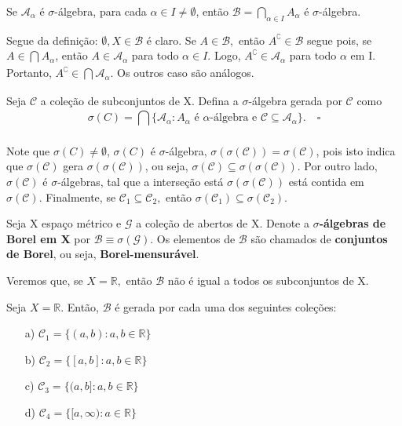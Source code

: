 \documentclass[measure_theory.tex]{subfiles}
\begin{document}
\begin{lemma*}
	Se \(\mathcal{A}_{\alpha }\) é \(\sigma \)-álgebra, para cada \(\alpha \in I \neq\emptyset\), então \(\mathcal{B} = \bigcap_{\alpha \in I}^{}A_{\alpha }\) é \(\sigma \)-álgebra.
\end{lemma*}
\begin{proof*}
	Segue da definição: \(\emptyset , X\in \mathcal{B}\) é claro. Se \(A\in \mathcal{B}, \) então \(A ^{\complement}\in \mathcal{B}\) segue pois, se \(A\in \bigcap_{}^{}A_{\alpha }\), então
	\(A\in \mathcal{A}_{\alpha }\) para todo \(\alpha \in I.\) Logo, \(A ^{\complement}\in \mathcal{A}_{\alpha }\) para todo \(\alpha \) em I. Portanto, \(A ^{\complement}\in \bigcap_{}^{}\mathcal{A}_{\alpha }\).
	Os outros caso são análogos. \qedsymbol
\end{proof*}
\begin{def*}
	Seja \(\mathcal{C}\) a coleção de subconjuntos de X. Defina a \(\sigma \)-álgebra gerada por \(\mathcal{C}\) como
	\[
		\sigma (C) = \bigcap_{}^{}\biggl\{\mathcal{A}_{\alpha }: A_{\alpha }\text{ é }\alpha \text{-álgebra e } \mathcal{C}\subseteq \mathcal{A}_{\alpha }\biggr\}.\quad \square
	\]
\end{def*}
Note que \(\sigma (C)\neq\emptyset\), \(\sigma (C) \) é \(\sigma \)-álgebra, \(\sigma (\sigma (\mathcal{C})) = \sigma (\mathcal{C})\), pois isto indica que \(\sigma (\mathcal{C})\) gera \(\sigma (\sigma (\mathcal{C}))\), ou seja, \(\sigma (\mathcal{C}) \subseteq \sigma (\sigma (\mathcal{C}))\). Por outro lado, \(\sigma (\mathcal{C})\) é \(\sigma \)-álgebras, tal que a interseção
está \(\sigma (\sigma (\mathcal{C}))\) está contida em \(\sigma (\mathcal{C}).\) Finalmente, se \(\mathcal{C}_{1}\subseteq \mathcal{C}_{2},\) então
\(\sigma (\mathcal{C}_{1}) \subseteq \sigma (\mathcal{C}_{2})\).
\begin{def*}
	Seja X espaço métrico e \(\mathcal{G}\) a coleção de abertos de X. Denote a \(\sigma \)\textbf{-álgebras de Borel em X} por \(\mathcal{B}\equiv \sigma (\mathcal{G}).\) Os elementos de \(\mathcal{B}\) são
	chamados de \textbf{conjuntos de Borel}, ou seja, \textbf{Borel-mensurável}.
\end{def*}
Veremos que, se \(X = \mathbb{R}, \) então \(\mathcal{B}\) não é igual a todos os subconjuntos de X.
\begin{prop*}
	Seja \(X = \mathbb{R}.\) Então, \(\mathcal{B}\) é gerada por cada uma dos seguintes coleções:
	\begin{itemize}
		\item[a)] \(\mathcal{C}_{1} = \{(a, b):a, b\in \mathbb{R}\}\)
		\item[b)] \(\mathcal{C}_{2} = \{[a, b]:a, b\in \mathbb{R}\}\)
		\item[c)] \(\mathcal{C}_{3} = \{(a, b]:a, b\in \mathbb{R}\}\)
		\item[d)] \(\mathcal{C}_{4} = \{[a, \infty):a\in \mathbb{R}\}\)
	\end{itemize}
\end{prop*}
\end{document}
